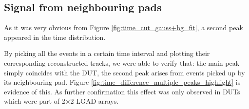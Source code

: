 \subsection{Signal from neighbouring pads}\label{sec:multiple_peaks}

As it was very obvious from Figure \ref{fig:time_cut_gauss+bg_fit}, a second peak appeared in the time distribution.

By picking all the events in a certain time interval and plotting their corresponding reconstructed tracks, we were able to verify that: the main peak simply coincides with the DUT, the second peak arises from events picked up by its neighbouring pad. Figure \ref{fig:time_difference_multiple_peaks_highlight} is evidence of this.
As further confirmation this effect was only observed in DUTs which were part of 2\(\times\)2 LGAD arrays.


